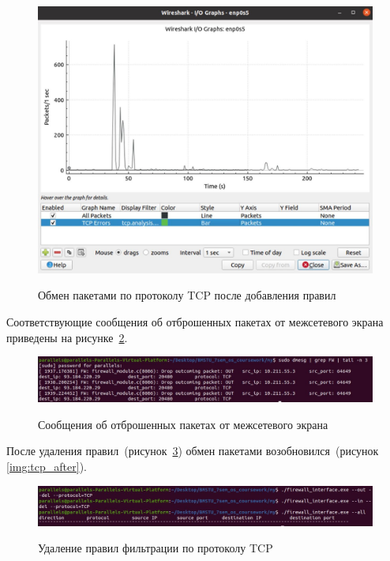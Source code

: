 \clearpage
\begin{figure}[h!]
	\begin{center}
		{\includegraphics[scale = 0.3]{inc/img/tcp_middle.jpg}}
		\caption{Обмен пакетами по протоколу TCP после добавления правил}
		\label{img:tcp_middle}
	\end{center}
\end{figure}

Соответствующие сообщения об отброшенных пакетах от межсетевого экрана приведены на рисунке~\ref{img:tcp_mess}.


\begin{figure}[h!]
	\begin{center}
		{\includegraphics[scale = 0.35]{inc/img/tcp_mess.jpg}}
		\caption{Сообщения об отброшенных пакетах от межсетевого экрана}
		\label{img:tcp_mess}
	\end{center}
\end{figure}

\clearpage
После удаления правил~(рисунок~\ref{img:tcp_delete}) обмен пакетами возобновился~(рисунок \ref{img:tcp_after}).


\begin{figure}[h!]
	\begin{center}
		{\includegraphics[scale = 0.35]{inc/img/tcp_delete.jpg}}
		\caption{Удаление правил фильтрации по протоколу TCP}
		\label{img:tcp_delete}
	\end{center}
\end{figure}


